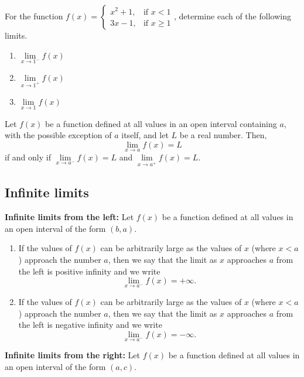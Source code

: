 \begin{example}
  For the function
  \(f(x)=\begin{cases}x^2+1, & \text{if }x<1\\ 3x-1, & \text{if }x\ge 1\end{cases}\),
  determine each of the following limits.
  
  \begin{enumerate}
  \item
    \(\lim\limits_{x \to 1^-}f(x)\)
  \item
    \(\lim\limits_{x \to 1^+}f(x)\)
  \item
    \(\lim\limits_{x\to 1}f(x)\)
  \end{enumerate}
\end{example}

\begin{theorem}
  Let \(f(x)\) be a function defined at all values in an
  open interval containing \(a\), with the possible exception of \(a\)
  itself, and let \(L\) be a real number. Then,
  \[\lim\limits_{x \to a}f(x)=L\]
  if and only if \(\lim\limits_{x \to a^-}f(x)=L\) and
  \(\lim\limits_{x \to a^+} f(x)=L\).
\end{theorem}

\hypertarget{infinite-limits}{%
\subsection{Infinite limits}\label{infinite-limits}}

\textbf{Infinite limits from the left:} Let \(f(x)\) be a function
defined at all values in an open interval of the form \((b,a)\).

\begin{enumerate}[sepno]
\item
  If the values of \(f(x)\) can be arbitrarily large as the values of
  \(x\) (where \(x<a\)) approach the number \(a\), then we say that the
  limit as \(x\) approaches \(a\) from the left is positive infinity and
  we write \[\lim\limits_{x \to a^-}f(x)=+\infty.\]
\item
  If the values of \(f(x)\) can be arbitrarily large as the values of
  \(x\) (where \(x<a\)) approach the number \(a\), then we say that the
  limit as \(x\) approaches \(a\) from the left is negative infinity and
  we write \[\lim\limits_{x \to a^-}f(x)=-\infty.\]
\end{enumerate}

\textbf{Infinite limits from the right:} Let \(f(x)\) be a function
defined at all values in an open interval of the form \((a,c)\).

